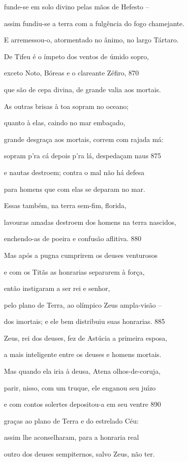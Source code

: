funde-se em solo divino pelas mãos de Hefesto --

assim fundiu-se a terra com a fulgência do fogo chamejante.

E arremessou-o, atormentado no ânimo, no largo Tártaro.

\quad{}De Tifeu é o ímpeto dos ventos de úmido sopro,

exceto Noto, Bóreas e o clareante Zéfiro, \num{870}

que são de cepa divina, de grande valia aos mortais.

As outras brisas à toa sopram no oceano;

quanto à elas, caindo no mar embaçado,

grande desgraça aos mortais, correm com rajada má:

sopram p'ra cá depois p'ra lá, despedaçam naus \num{875}

e nautas destroem; contra o mal não há defesa

para homens que com elas se deparam no mar.

Essas também, na terra sem-fim, florida,

lavouras amadas destroem dos homens na terra nascidos,

enchendo-as de poeira e confusão aflitiva. \num{880}

\medskip

Mas após a pugna cumprirem os deuses venturosos

e com os Titãs as honrarias separarem à força,

então instigaram a ser rei e senhor,

pelo plano de Terra, ao olímpico Zeus ampla-visão --

dos imortais; e ele bem distribuiu suas honrarias. \num{885}

\quad{}Zeus, rei dos deuses, fez de Astúcia a primeira esposa,

a mais inteligente entre os deuses e homens mortais.

Mas quando ela iria à deusa, Atena olhos-de-coruja,

parir, nisso, com um truque, ele enganou seu juízo

e com contos solertes depositou-a em seu ventre \num{890}

graças ao plano de Terra e do estrelado Céu:

assim lhe aconselharam, para a honraria real

outro dos deuses sempiternos, salvo Zeus, não ter.

